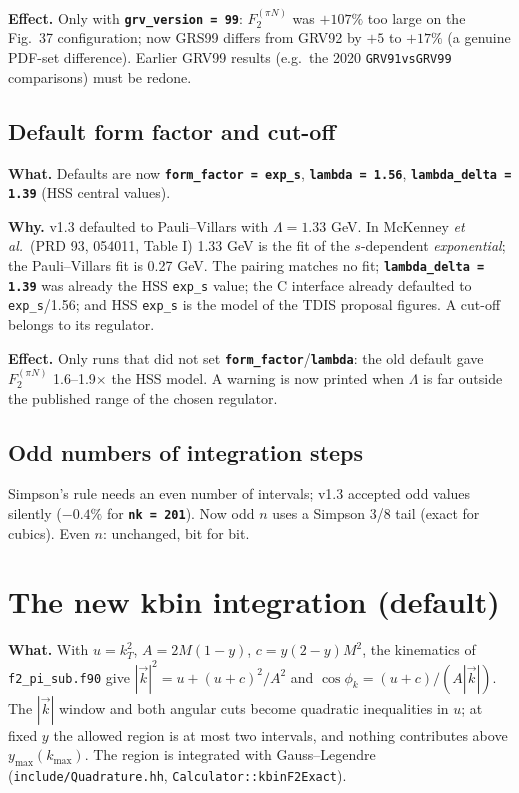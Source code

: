 \documentclass[11pt,a4paper]{article}
\newcommand{\key}[1]{\texttt{\textbf{#1}}}
\begin{document}
\textbf{Effect.} Only with \key{grv\_version = 99}: $F_2^{(\pi N)}$ was
$+107\%$ too large on the Fig.~37 configuration; now GRS99 differs from GRV92
by $+5$ to $+17\%$ (a genuine PDF-set difference).  Earlier GRV99 results
(e.g.\ the 2020 \texttt{GRV91vsGRV99} comparisons) must be redone.

\subsection{Default form factor and cut-off}
\textbf{What.} Defaults are now \key{form\_factor = exp\_s},
\key{lambda = 1.56}, \key{lambda\_delta = 1.39} (HSS central values).

\textbf{Why.} v1.3 defaulted to Pauli--Villars with $\Lambda=1.33$ GeV.  In
McKenney \textit{et al.}\ (PRD 93, 054011, Table I) 1.33 GeV is the fit of
the $s$-dependent \emph{exponential}; the Pauli--Villars fit is 0.27 GeV.  The
pairing matches no fit; \key{lambda\_delta = 1.39} was already the HSS
\texttt{exp\_s} value; the C interface already defaulted to
\texttt{exp\_s}/1.56; and HSS \texttt{exp\_s} is the model of the TDIS
proposal figures.  A cut-off belongs to its regulator.

\textbf{Effect.} Only runs that did not set \key{form\_factor}/\key{lambda}:
the old default gave $F_2^{(\pi N)}$ 1.6--1.9$\times$ the HSS model.  A
warning is now printed when $\Lambda$ is far outside the published range of
the chosen regulator.

\subsection{Odd numbers of integration steps}
Simpson's rule needs an even number of intervals; v1.3 accepted odd values
silently ($-0.4\%$ for \key{nk = 201}).  Now odd $n$ uses a Simpson 3/8 tail
(exact for cubics).  Even $n$: unchanged, bit for bit.

\section{The new kbin integration (default)}
\label{sec:exact}

\textbf{What.} With $u=k_T^2$, $A=2M(1-y)$, $c=y(2-y)M^2$, the kinematics of
\texttt{f2\_pi\_sub.f90} give $|\vec k|^2=u+(u+c)^2/A^2$ and
$\cos\phi_k=(u+c)/(A|\vec k|)$.  The $|\vec k|$ window and both angular cuts
become quadratic inequalities in $u$; at fixed $y$ the allowed region is at
most two intervals, and nothing contributes above
$y_{\max}(k_{\max})$.  The region is integrated with Gauss--Legendre
(\texttt{include/Quadrature.hh}, \texttt{Calculator::kbinF2Exact}).
\end{document}
